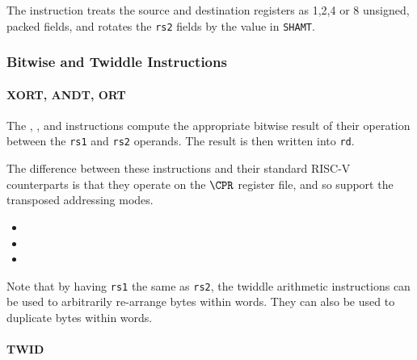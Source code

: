 The instruction  treats the source and destination registers as
1,2,4 or 8 unsigned, packed fields, and rotates the {\tt rs2} fields by
the value in {\tt SHAMT}.

\subsubsection{Bitwise and Twiddle Instructions}

\paragraph{XORT, ANDT, ORT}

The , , and  instructions compute the
appropriate bitwise result of their operation between the {\tt rs1} and
{\tt rs2} operands. The result is then written into {\tt rd}.

The difference between these instructions and their standard RISC-V
counterparts is that they operate on the $\CPR$ register file, and so
support the transposed addressing modes.

\begin{itemize}
\item {}
\item {}
\item {}
\end{itemize}

Note that by having {\tt rs1} the same as {\tt rs2}, the twiddle
arithmetic instructions can be used to arbitrarily re-arrange bytes
within words. They can also be used to duplicate bytes within words.

\paragraph{TWID}

